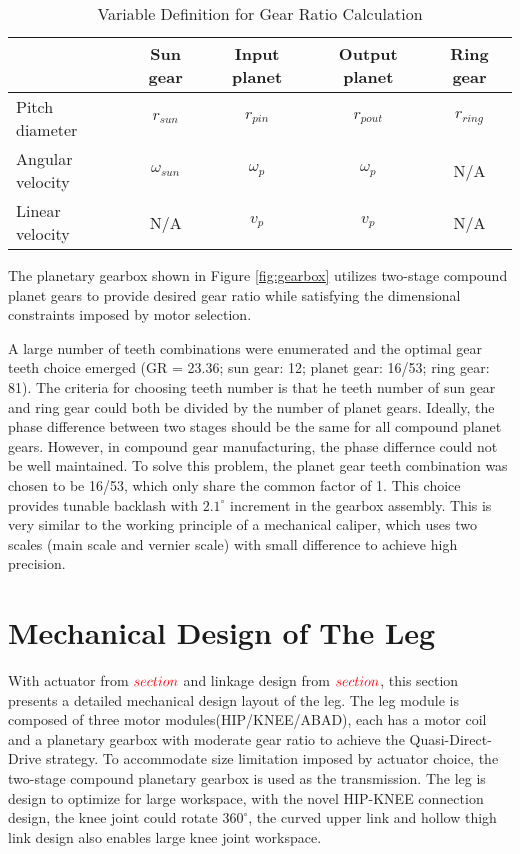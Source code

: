 \begin{table}[bp]
	\centering
	\caption{Variable Definition for Gear Ratio Calculation}
	\begin{tabular}{lcccc}\hline\hline
		& Sun gear		& Input planet	& Output planet	& Ring gear \\ \hline
		Pitch diameter	& $r_{sun}$	   	& $r_{pin}$		& $r_{pout}$	& $r_{ring}$\\
		Angular velocity& $\omega_{sun}$& $\omega_{p}$	& $\omega_{p}$	& N/A		\\
		Linear velocity	& N/A			& $v_p$			& $v_p$			& N/A		\\ \hline
	\end{tabular}
	\label{tab:varDefGearbox}
\end{table}

The planetary gearbox shown in Figure \ref{fig:gearbox} utilizes two-stage compound planet gears to provide desired gear ratio while satisfying the dimensional constraints imposed by motor selection. 


A large number of teeth combinations were enumerated and the optimal gear teeth choice emerged (GR = 23.36; sun gear: 12; planet gear: 16/53; ring gear: 81). The criteria for choosing teeth number is that he teeth number of sun gear and ring gear could both be divided by the number of planet gears. Ideally, the phase difference between two stages should be the same for all compound planet gears. However, in compound gear manufacturing, the phase differnce could not be well maintained. To solve this problem, the planet gear teeth combination was chosen to be 16/53, which only share the common factor of 1. This choice provides tunable backlash with $2.1^{\circ}$ increment in the gearbox assembly. This is very similar to the working principle of a mechanical caliper, which uses two scales (main scale and vernier scale) with small difference to achieve high precision.

\section{\textbf{Mechanical Design of The Leg}}
\label{sec:LegDesign}

With actuator from $\color{red}section$ and linkage design from $\color{red}section$, this section presents a detailed mechanical design layout of the leg. The leg module is composed of three motor modules(HIP/KNEE/ABAD), each has a motor coil and a planetary gearbox with moderate gear ratio to achieve the Quasi-Direct-Drive\cite{20162016} strategy. To accommodate size limitation imposed by actuator choice, the two-stage compound planetary gearbox is used as the transmission. The leg is design to optimize for large workspace, with the novel HIP-KNEE connection design, the knee joint could rotate $360^{\circ}$, the curved upper link and hollow thigh link design also enables large knee joint workspace.
  
